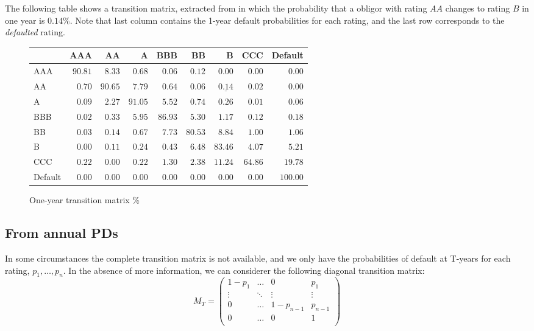 \documentclass[11pt,fleqn]{book} %
\begin{document}
\begin{example}
	\label{ex:1ytm}
	The following table shows a transition matrix, extracted from 
	\cite[p. 20]{cmetrics:1997} in which the probability that a obligor with 
	rating $AA$ changes to rating $B$ in one year is $0.14\%$. Note that last 
	column contains the 1-year default probabilities for each rating, and the 
	last row corresponds to the \emph{defaulted} rating.
	\begin{figure}[!h]
		\begin{center}
			\begin{tabular}[]{l|rrrrrrrr}
				        & AAA     & AA      & A       & BBB     & BB      & B                  & CCC     & Default  \\
				\hline
				AAA     & $90.81$ & $8.33$  & $0.68$  & $0.06$  & $0.12$  & $0.00$             & $0.00$  & $0.00$   \\
				AA      & $0.70$  & $90.65$ & $7.79$  & $0.64$  & $0.06$  & $\underline{0.14}$ & $0.02$  & $0.00$   \\
				A       & $0.09$  & $2.27$  & $91.05$ & $5.52$  & $0.74$  & $0.26$             & $0.01$  & $0.06$   \\
				BBB     & $0.02$  & $0.33$  & $5.95$  & $86.93$ & $5.30$  & $1.17$             & $0.12$  & $0.18$   \\
				BB      & $0.03$  & $0.14$  & $0.67$  & $7.73$  & $80.53$ & $8.84$             & $1.00$  & $1.06$   \\
				B       & $0.00$  & $0.11$  & $0.24$  & $0.43$  & $6.48$  & $83.46$            & $4.07$  & $5.21$   \\
				CCC     & $0.22$  & $0.00$  & $0.22$  & $1.30$  & $2.38$  & $11.24$            & $64.86$ & $19.78$  \\
				Default & $0.00$  & $0.00$  & $0.00$  & $0.00$  & $0.00$  & $0.00$             & $0.00$  & $100.00$ \\
			\end{tabular}
			\caption{One-year transition matrix \%}
			\label{tmatrix1}
		\end{center}
	\end{figure}
\end{example}

\subsection{From annual PDs}
\label{pdfsv}

In some circumstances the complete transition matrix is not available, 
and we only have the probabilities of default at T-years for each rating, 
$p_1,\dots,p_n$. In the absence of more information, we can considerer 
the following diagonal transition matrix:
\begin{displaymath}
	M_T = \left(
	\begin{array}{cccc}
		1-p_1  & \dots  & 0         & p_1     \\
		\vdots & \ddots & \vdots    & \vdots  \\
		0      & \dots  & 1-p_{n-1} & p_{n-1} \\
		0      & \dots  & 0         & 1       \\
	\end{array}
	\right)
\end{displaymath}
\end{document}
